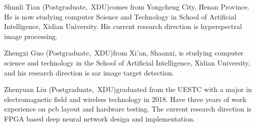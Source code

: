 \documentclass[lettersize,journal]{IEEEtran}
\begin{document}
\begin{IEEEbiography}{Shunli Tian}
	(Postgraduate,~XDU)comes from Yongcheng City, Henan Province. He is now studying computer Science and Technology in School of Artificial Intelligence, Xidian University. His current research direction is hyperspectral image processing.\end{IEEEbiography}

\begin{IEEEbiography}{Zhengxi Guo}
	(Postgraduate,~XDU)from Xi'an, Shaanxi, is studying computer science and technology in the School of Artificial Intelligence, Xidian University, and his research direction is sar image target detection.\end{IEEEbiography}

\begin{IEEEbiography}{Zhenyuan Liu}
	(Postgraduate,~XDU)graduated from the UESTC with a major in electromagnetic field and wireless technology in 2018. Have three years of work experience on pcb layout and hardware testing. The current research direction is FPGA based deep neural network design and implementation.\end{IEEEbiography}
\end{document}
